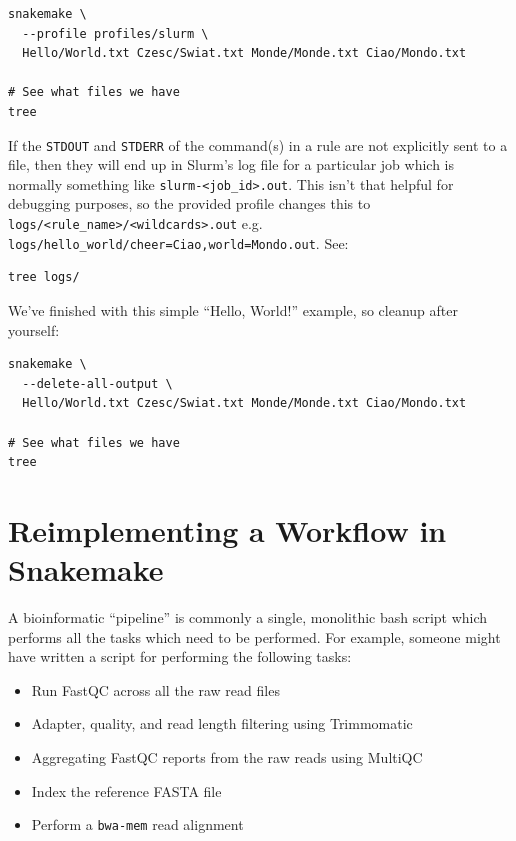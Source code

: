 \begin{lstlisting}
snakemake \
  --profile profiles/slurm \
  Hello/World.txt Czesc/Swiat.txt Monde/Monde.txt Ciao/Mondo.txt

# See what files we have
tree
\end{lstlisting}

If the \texttt{STDOUT} and \texttt{STDERR} of the command(s) in a rule are not explicitly sent to a file, then they will
end up in Slurm's log file for a particular job which is normally something like \texttt{slurm-<job\_id>.out}. This isn't
that helpful for debugging purposes, so the provided profile changes this to \texttt{logs/<rule\_name>/<wildcards>.out}
e.g. \texttt{logs/hello\_world/cheer=Ciao,world=Mondo.out}. See:

\begin{lstlisting}
tree logs/
\end{lstlisting}

We've finished with this simple ``Hello, World!'' example, so cleanup after yourself:

\begin{lstlisting}
snakemake \
  --delete-all-output \
  Hello/World.txt Czesc/Swiat.txt Monde/Monde.txt Ciao/Mondo.txt

# See what files we have
tree
\end{lstlisting}

\section{Reimplementing a Workflow in Snakemake}

A bioinformatic ``pipeline'' is commonly a single, monolithic bash script which performs all the tasks which need
to be performed. For example, someone might have written a script for performing the following tasks:

\begin{itemize}
  \item Run FastQC across all the raw read files
  \item Adapter, quality, and read length filtering using Trimmomatic
  \item Aggregating FastQC reports from the raw reads using MultiQC
  \item Index the reference FASTA file
  \item Perform a \texttt{bwa-mem} read alignment
\end{itemize}

